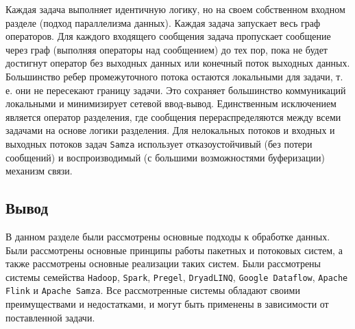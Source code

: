 Каждая задача выполняет идентичную логику, но на своем собственном входном разделе (подход параллелизма данных). 
Каждая задача запускает весь граф операторов. 
Для каждого входящего сообщения задача пропускает сообщение через граф (выполняя операторы над сообщением) до тех пор, пока не будет достигнут оператор без выходных данных или конечный поток выходных данных. 
Большинство ребер промежуточного потока остаются локальными для задачи, т. е. они не пересекают границу задачи. 
Это сохраняет большинство коммуникаций локальными и минимизирует сетевой ввод-вывод. 
Единственным исключением является оператор разделения, где сообщения перераспределяются между всеми задачами на основе логики разделения. 
Для нелокальных потоков и входных и выходных потоков задач \texttt{Samza} использует отказоустойчивый (без потери сообщений) и воспроизводимый (с большими возможностями буферизации) механизм связи.

\subsection*{Вывод}

В данном разделе были рассмотрены основные подходы к обработке данных. 
Были рассмотрены основные принципы работы пакетных и потоковых систем, а также рассмотрены основные реализации таких систем. 
Были рассмотрены системы семейства \texttt{Hadoop}, \texttt{Spark}, \texttt{Pregel}, \texttt{DryadLINQ}, \texttt{Google Dataflow}, \texttt{Apache Flink} и \texttt{Apache Samza}. 
Все рассмотренные системы обладают своими преимуществами и недостатками, и могут быть применены в зависимости от поставленной задачи. 

\clearpage
